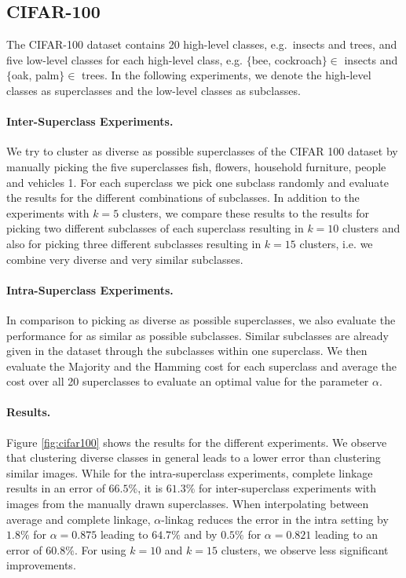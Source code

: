 \subsection{CIFAR-100}

The CIFAR-100 dataset contains 20 high-level classes, e.g.\ insects and trees, and five low-level classes for each high-level class, e.g. $\{$bee, cockroach$\} \in$ insects and $\{$oak, palm$\} \in$ trees. In the following experiments, we denote the high-level classes as superclasses and the low-level classes as subclasses.

\paragraph{Inter-Superclass Experiments.} We try to cluster as diverse as possible superclasses of the CIFAR 100 dataset by manually picking the five superclasses fish, flowers, household furniture, people and vehicles 1. For each superclass we pick one subclass randomly and evaluate the results for the different combinations of subclasses. In addition to the experiments with $k = 5$ clusters, we compare these results to the results for picking two different subclasses of each superclass resulting in $k = 10$ clusters and also for picking three different subclasses resulting in $k = 15$ clusters, i.e. we combine very diverse and very similar subclasses.

\paragraph{Intra-Superclass Experiments.} In comparison to picking as diverse as possible superclasses, we also evaluate the performance for as similar as possible subclasses. Similar subclasses are already given in the dataset through the subclasses within one superclass. We then evaluate the Majority and the Hamming cost for each superclass and average the cost over all 20 superclasses to evaluate an optimal value for the parameter $\alpha$. 

\paragraph{Results.} Figure \ref{fig:cifar100} shows the results for the different experiments. We observe that clustering diverse classes in general leads to a lower error than clustering similar images. While for the intra-superclass experiments, complete linkage results in an error of $66.5\%$, it is $61.3\%$ for inter-superclass experiments with images from the manually drawn superclasses. When interpolating between average and complete linkage, $\alpha$-linkag reduces the error in the intra setting by $1.8\%$ for $\alpha = 0.875$ leading to $64.7\%$ and by $0.5\%$ for $\alpha = 0.821$ leading to an error of $60.8\%$. For using $k = 10$ and $k = 15$ clusters, we observe less significant improvements.

